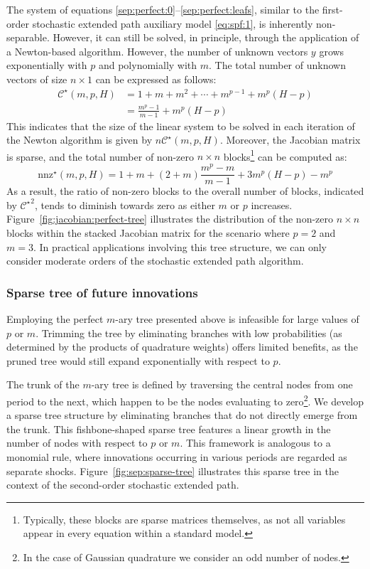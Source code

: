 \documentclass[a4paper,11pt]{amsart}
\begin{document}
The system of equations
\eqref{sep:perfect:0}--\eqref{sep:perfect:leafs}, similar to the
first-order stochastic extended path auxiliary model \eqref{eq:spf:1},
is inherently non-separable. However, it can still be solved, in
principle, through the application of a Newton-based
algorithm. However, the number of unknown vectors $y$ grows
exponentially with $p$ and polynomially with $m$. The total number of
unknown vectors of size $n \times 1$ can be expressed as follows:
\[
   \begin{split}
      \mathcal C^{\star}(m,p,H) & = 1 + m + m^2 + \cdots + m^{p-1} + m^p(H-p) \\
                                & = \frac{m^p - 1}{m - 1} + m^p(H - p)
   \end{split}
\]
This indicates that the size of the linear system to be solved in each
iteration of the Newton algorithm is given
by $n \mathcal C^{\star}(m,p,H)$. Moreover, the Jacobian matrix is
sparse, and the total number of non-zero $n \times n$
blocks\footnote{Typically, these blocks are sparse matrices themselves,
   as not all variables appear in every equation within a standard
   model.} can be computed as:
\[
   \mathrm{nnz}^{\star}(m,p,H) = 1 + m + (2 + m) \frac{m^p - m}{m - 1} + 3m^p(H - p) - m^p
\]
As a result, the ratio of non-zero blocks to the overall number of
blocks, indicated by $\left.\mathcal C^{\star}\right.^2$, tends to
diminish towards zero as either $m$ or $p$
increases. Figure~\ref{fig:jacobian:perfect-tree} illustrates the
distribution of the non-zero $n \times n$ blocks within the stacked
Jacobian matrix for the scenario where \( p = 2 \) and \( m = 3 \). In
practical applications involving this tree structure, we can only
consider moderate orders of the stochastic extended path algorithm.\newline

\subsubsection{Sparse tree of future innovations}\label{sec:fishbone-tree} Employing the
perfect $m$-ary tree presented above is infeasible for large values
of $p$ or $m$. Trimming the tree by eliminating branches with low
probabilities (as determined by the products of quadrature weights)
offers limited benefits, as the pruned tree would still expand
exponentially with respect to $p$.\newline

The trunk of the $m$-ary tree is defined by traversing the central
nodes from one period to the next, which happen to be the nodes
evaluating to zero\footnote{In the case of Gaussian quadrature we
   consider an odd number of nodes.}. We develop a sparse tree
structure by eliminating branches that do not directly emerge from the
trunk. This fishbone-shaped sparse tree features a linear growth in
the number of nodes with respect to $p$ or $m$. This framework is
analogous to a monomial rule, where innovations occurring in various
periods are regarded as separate
shocks. Figure~\ref{fig:sep:sparse-tree} illustrates this sparse tree
in the context of the second-order stochastic extended path.\newline
\end{document}
